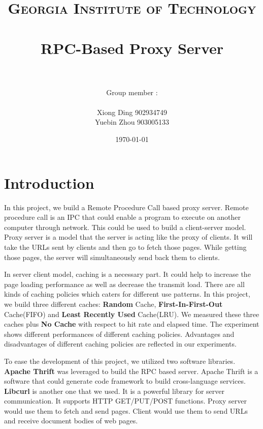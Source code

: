\documentclass[paper=a4, fontsize=11pt]{scrartcl} %
\title{	
\normalfont \normalsize 
\textsc{Georgia Institute of Technology } \\ [25pt] %
\horrule{0.5pt} \\[0.4cm] %
\huge RPC-Based Proxy Server \\ %
\horrule{2pt} \\[0.5cm] %
}
\author{Group member : \\
\\
 Xiong Ding 902934749 \\ 
 Yuebin Zhou 903005133
} %
\date{\normalsize\today} %
\numberwithin{equation}{section} %
\numberwithin{figure}{section} %
\numberwithin{table}{section} %
\begin{document}
\maketitle %


\section{Introduction}

In this project, we build a Remote Procedure Call based proxy server. Remote procedure call is an IPC that could enable a program to execute on another computer through network. This could be used to build a client-server model. Proxy server is a model that the server is acting like the proxy of clients. It will take the URLs sent by clients and then go to fetch those pages. While getting those pages, the server will simultaneously send back them to clients. 

\vspace{1em}

In server client model, caching is a necessary part. It could help to increase the page loading performance as well as decrease the transmit load. There are all kinds of caching policies which caters for different use patterns. In this project, we build three different caches: 
\textbf{Random} Cache, \textbf{First-In-First-Out} Cache(FIFO) and
\textbf{Least Recently Used} Cache(LRU). We measured these three caches plus \textbf{No Cache} with respect to hit rate and elapsed time. The experiment shows different performances of different caching policies. Advantages and disadvantages of different caching policies are reflected in our experiments.

\vspace{0.5em}

To ease the development of this project, we utilized two software libraries. \textbf{Apache Thrift} was leveraged to build the RPC based server. Apache Thrift is a software that could generate code framework to build cross-language services. 
\textbf{Libcurl} is another one that we used. It is a powerful library for server communication. It supports HTTP GET/PUT/POST functions. Proxy server would use them to fetch and send pages. Client would use them to send URLs and receive document bodies of web pages. 
\end{document}
